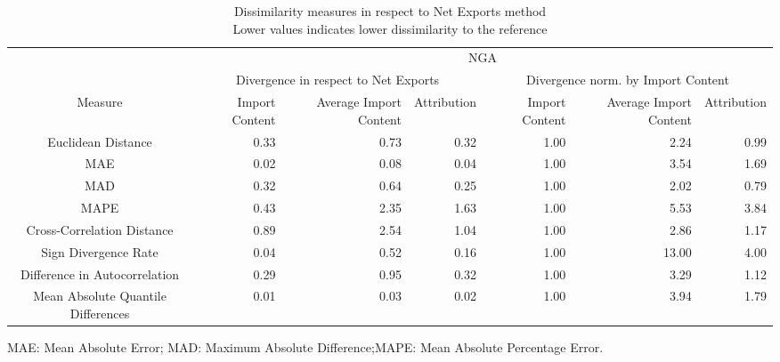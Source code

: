 \begin{table}[t]
\caption*{
{\large Dissimilarity measures in respect to Net Exports method} \\ 
{\small Lower values indicates lower dissimilarity to the reference}
} 
\fontsize{15.0pt}{18.0pt}\selectfont
\begin{tabular*}{\linewidth}{@{\extracolsep{\fill}}crrrrrr}
\toprule
 & \multicolumn{6}{c}{NGA} \\ 
\cmidrule(lr){2-7}
 & \multicolumn{3}{c}{Divergence in respect to Net Exports} & \multicolumn{3}{c}{Divergence norm. by Import Content} \\ 
\cmidrule(lr){2-4} \cmidrule(lr){5-7}
Measure & Import Content & Average Import Content & Attribution & Import Content & Average Import Content & Attribution \\ 
\midrule\addlinespace[2.5pt]
Euclidean Distance & 0.33 & 0.73 & 0.32 & 1.00 & 2.24 & 0.99 \\ 
MAE & 0.02 & 0.08 & 0.04 & 1.00 & 3.54 & 1.69 \\ 
MAD & 0.32 & 0.64 & 0.25 & 1.00 & 2.02 & 0.79 \\ 
MAPE & 0.43 & 2.35 & 1.63 & 1.00 & 5.53 & 3.84 \\ 
Cross-Correlation Distance & 0.89 & 2.54 & 1.04 & 1.00 & 2.86 & 1.17 \\ 
Sign Divergence Rate & 0.04 & 0.52 & 0.16 & 1.00 & 13.00 & 4.00 \\ 
Difference in Autocorrelation & 0.29 & 0.95 & 0.32 & 1.00 & 3.29 & 1.12 \\ 
Mean Absolute Quantile Differences & 0.01 & 0.03 & 0.02 & 1.00 & 3.94 & 1.79 \\ 
\bottomrule
\end{tabular*}
\begin{minipage}{\linewidth}
MAE: Mean Absolute Error; MAD: Maximum Absolute Difference;MAPE: Mean Absolute Percentage Error.\\
\end{minipage}
\end{table}


